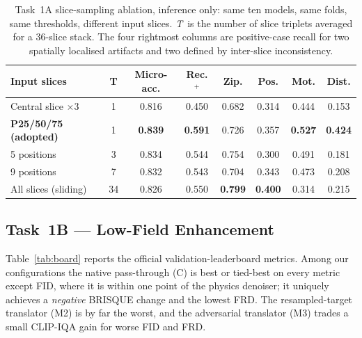 \documentclass[runningheads]{llncs}
\begin{document}
\begin{table}[!htbp]
\caption{Task~1A slice-sampling ablation, inference only: same ten models, same folds,
same thresholds, different input slices. \emph{T}\ is the number of slice triplets
averaged for a 36-slice stack. The four rightmost columns are positive-case recall for
two spatially localised artifacts and two defined by inter-slice inconsistency.}
\label{tab:slice}
\centering
\setlength{\tabcolsep}{4pt}
\footnotesize
\begin{tabular}{lccccccc}
\toprule
Input slices & T & Micro-acc. & Rec.$^{+}$ & Zip. & Pos. & Mot. & Dist. \\
\midrule
Central slice $\times3$    &  1 & 0.816 & 0.450 & 0.682 & 0.314 & 0.444 & 0.153 \\
\textbf{P25/50/75 (adopted)} &  1 & \textbf{0.839} & \textbf{0.591} & 0.726 & 0.357
  & \textbf{0.527} & \textbf{0.424} \\
5 positions                &  3 & 0.834 & 0.544 & 0.754 & 0.300 & 0.491 & 0.181 \\
9 positions                &  7 & 0.832 & 0.543 & 0.704 & 0.343 & 0.473 & 0.208 \\
All slices (sliding)       & 34 & 0.826 & 0.550 & \textbf{0.799} & \textbf{0.400}
  & 0.314 & 0.215 \\
\bottomrule
\end{tabular}
\end{table}

\subsection{Task~1B --- Low-Field Enhancement}
\label{sec:r1b}

Table~\ref{tab:board} reports the official validation-leaderboard metrics.
Among our configurations the native pass-through (C) is best or tied-best on
every metric except FID, where it is within one point of the physics denoiser; it
uniquely achieves a \emph{negative} BRISQUE change and the lowest FRD. The
resampled-target translator (M2) is by far the worst, and the adversarial
translator (M3) trades a small CLIP-IQA gain for worse FID and FRD.
\end{document}

